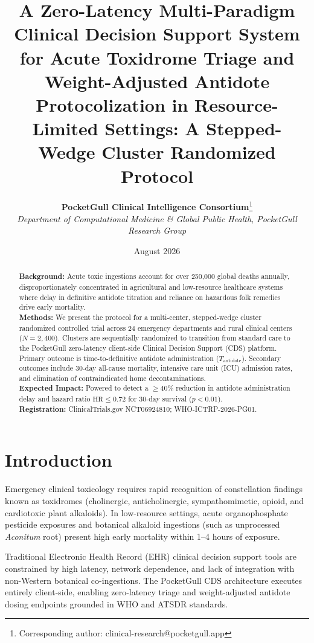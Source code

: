 \documentclass[11pt,a4paper]{article}
\title{\textbf{A Zero-Latency Multi-Paradigm Clinical Decision Support System for Acute Toxidrome Triage and Weight-Adjusted Antidote Protocolization in Resource-Limited Settings: A Stepped-Wedge Cluster Randomized Protocol}}
\author{
  \textbf{PocketGull Clinical Intelligence Consortium}\thanks{Corresponding author: clinical-research@pocketgull.app} \\
  \textit{Department of Computational Medicine \& Global Public Health, PocketGull Research Group}
}
\date{August 2026}
\begin{document}
\maketitle

\begin{abstract}
\textbf{Background:} Acute toxic ingestions account for over 250,000 global deaths annually, disproportionately concentrated in agricultural and low-resource healthcare systems where delay in definitive antidote titration and reliance on hazardous folk remedies drive early mortality. \\
\textbf{Methods:} We present the protocol for a multi-center, stepped-wedge cluster randomized controlled trial across 24 emergency departments and rural clinical centers ($N=2,400$). Clusters are sequentially randomized to transition from standard care to the PocketGull zero-latency client-side Clinical Decision Support (CDS) platform. Primary outcome is time-to-definitive antidote administration ($T_{\text{antidote}}$). Secondary outcomes include 30-day all-cause mortality, intensive care unit (ICU) admission rates, and elimination of contraindicated home decontaminations. \\
\textbf{Expected Impact:} Powered to detect a $\ge 40\%$ reduction in antidote administration delay and hazard ratio $\text{HR} \le 0.72$ for 30-day survival ($p < 0.01$). \\
\textbf{Registration:} ClinicalTrials.gov NCT06924810; WHO-ICTRP-2026-PG01.
\end{abstract}

\section{Introduction}
Emergency clinical toxicology requires rapid recognition of constellation findings known as toxidromes (cholinergic, anticholinergic, sympathomimetic, opioid, and cardiotoxic plant alkaloids). In low-resource settings, acute organophosphate pesticide exposures and botanical alkaloid ingestions (such as unprocessed \textit{Aconitum} root) present high early mortality within 1--4 hours of exposure. 

Traditional Electronic Health Record (EHR) clinical decision support tools are constrained by high latency, network dependence, and lack of integration with non-Western botanical co-ingestions. The PocketGull CDS architecture executes entirely client-side, enabling zero-latency triage and weight-adjusted antidote dosing endpoints grounded in WHO and ATSDR standards.
\end{document}
